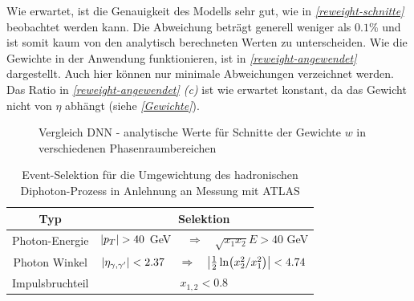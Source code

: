 Wie erwartet, ist die Genauigkeit des Modells sehr gut, wie in \textit{\autoref{reweight-schnitte}} beobachtet werden kann. Die Abweichung beträgt generell weniger als $0.1\%$ und ist somit kaum von den analytisch berechneten Werten zu unterscheiden. Wie die Gewichte in der Anwendung funktionieren, ist in \textit{\autoref{reweight-angewendet}} dargestellt. Auch hier können nur minimale Abweichungen verzeichnet werden. Das Ratio in \textit{\autoref{reweight-angewendet} (c)}  ist wie erwartet konstant, da das Gewicht nicht von $\eta$ abhängt (siehe \textit{\autoref{Gewichte}}). 
\begin{figure}[htb]
	\centering
	\caption{Vergleich DNN - analytische Werte für Schnitte der Gewichte $w$ in verschiedenen Phasenraumbereichen}
	\label{reweight-schnitte}
\end{figure}
\begin{table}[b]
	\centering
	\begin{tabular}{|c|c|}
		\hline
		Typ & Selektion \\
		\hline
		Photon-Energie & $\abs{p_T} > 40$ GeV $\quad \Rightarrow \quad \sqrt{x_1 x_2}E > 40$ GeV \\
		Photon Winkel & $\abs{\eta_{\gamma, \gamma'}} < 2.37$ $ \quad \Rightarrow \quad \abs{\frac{1}{2}\ln({x_2^2}/{x_1^2})} < 4.74$ \\
		Impulsbruchteil & $x_{1,2} < 0.8 $\\
		\hline
	\end{tabular}
	\caption{Event-Selektion für die Umgewichtung des hadronischen Diphoton-Prozess in Anlehnung an Messung mit ATLAS \cite{Cuts-Paper}}
	\label{Selektionen}
\end{table}
